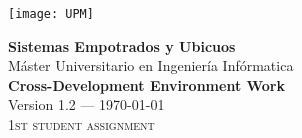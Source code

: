 \begin{titlepage}


\texttt{[image: UPM]}


\vfill\vspace{50pt}

\begin{center}
\textbf{\huge Sistemas Empotrados y Ubicuos}\\[\baselineskip]
{\large Máster Universitario en Ingeniería Infórmatica}\\[\baselineskip]
\textbf{\Huge Cross-Development Environment Work}\\[\baselineskip]
{\large Version 1.2 --- \today}\\[\baselineskip]
{\large\textsc{1st student assignment}}
\end{center}

\vfill


\end{titlepage}
